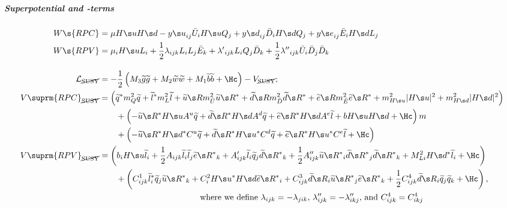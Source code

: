 \subparagraph{Superpotential and -terms}
\begin{align}
 W\s{RPC} &= \mu\Hu\Hd
           - {y\s u}_{ij} \bU_i\Hu Q_j
           + {y\s d}_{ij} \bD_i\Hd Q_j
           + {y\s e}_{ij} \bE_i\Hd L_j\\
 W\s{RPV} &= \mu_i\Hu L_i
           + \frac12{\lambda  }_{ijk} L_i L_j \bE_k
           + {\lambda' }_{ijk} L_i Q_j \bD_k
           + \frac12{\lambda''}_{ijk} \bU_i \bD_j \bD_k
\\[10pt]
 \Lag_{\text{\cancel{SUSY}}}&=
- \frac12\left(M_3\gno\gno+M_2\wno\wno+M_1\bno\bno+\Hc\right)
-V_{\text{\cancel{SUSY}}};\\
%
 V\suprm{RPC}_{\text{\cancel{SUSY}}}&=
\left(\sqL^*m_Q^2\sqL+\slL^*m_L^2\slL+\suR m_\bU^2\suR^* + \sdR m_\bD^2\sdR^* + \seR m_\bE^2\seR^*
       +m^2_{\Hu}|\Hu|^2 + m^2_{\Hd}|\Hd|^2\right)
\notag\\&\qquad
+\left(-\suR^*\Hu A^u\sqL + \sdR^* \Hd A^d \sqL+ \seR^* \Hd A^e \slL + b\Hu\Hd+\Hc\right)
m\\&\qquad
+\left(-\suR^*\Hd^*C^u\sqL+\sdR^* \Hu^*C^d\sqL+\seR^*\Hu^*C^e\slL+\Hc\right)
\notag\\
V\suprm{RPV}_{\text{\cancel{SUSY}}}&=
 \left(b_i\Hu\slL_i + \frac12A_{ijk}\slL_i\slL_j\seR^*{}_k+A'_{ijk}\slL_i\sqL_j\sdR^*{}_k
       +\frac12A''_{ijk}\suR^*{}_i\sdR^*{}_j\sdR^*{}_k + M^2_{Li}\Hd^*\slL_i+\Hc\right)
\\&\qquad + \left(C^1_{ijk}\slL_i^*\sqL_j\suR^*{}_k + C^2_i\Hu^*\Hd\seR^*{}_i + C^3_{ijk}\sdR{}_i\suR^*{}_j\seR^*{}_k+\frac12C^4_{ijk}\sdR{}_i\sqL_j\sqL_k+\Hc\right),
\\&\hspace{120pt}
\text{where we define $\lambda_{ijk}=-\lambda_{jik}$, $\lambda''_{ijk}=-\lambda''_{ikj}$, and 
$C^4_{ijk}=C^4_{ikj}$}\notag
\end{align}

\newpage
